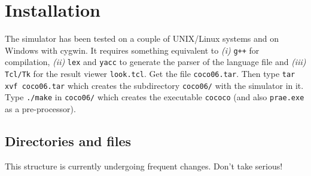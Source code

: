 \documentclass[12pt]{article}
\begin{document}
\vspace*{-6mm}
\section{Installation}

\vspace*{-4mm}
The simulator has been tested on a couple of UNIX/Linux systems and on Windows with cygwin.
It requires something equivalent to
{\sl (i)} \texttt{g++} for compilation,
{\sl (ii)} \texttt{lex} and \texttt{yacc} to generate the parser of the language file and
{\sl (iii)} \texttt{Tcl/Tk} for the result viewer \texttt{look.tcl}.
Get the file \texttt{coco06.tar}.
Then type \texttt{tar xvf coco06.tar} which creates the subdirectory \texttt{coco06/} with the simulator in it.
Type \texttt{./make} in \texttt{coco06/} which creates the executable \texttt{cococo} (and also \texttt{prae.exe} as a pre-processor).



\subsection{Directories and files}

This structure is currently undergoing frequent changes. Don't take serious!
\end{document}

